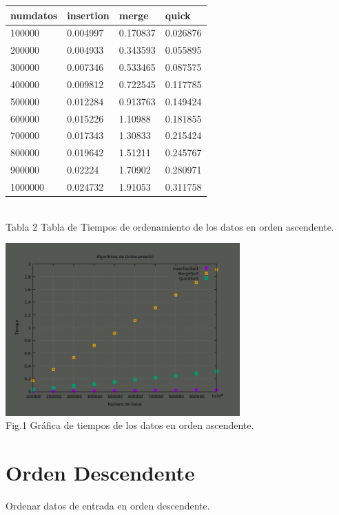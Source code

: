 \documentclass{article}
\begin{document}
\begin{center}
\begin{tabular}{|l|l|l|l|}
\hline
numdatos & insertion & merge & quick\\
\hline
100000 & 0.004997 & 0.170837 & 0.026876\\
200000 & 0.004933 & 0.343593 & 0.055895\\
300000 & 0.007346 & 0.533465 & 0.087575\\
400000 & 0.009812 & 0.722545 & 0.117785\\
500000 & 0.012284 & 0.913763 & 0.149424\\
600000 & 0.015226 & 1.10988 & 0.181855\\
700000 & 0.017343 & 1.30833 & 0.215424\\
800000 & 0.019642 & 1.51211 & 0.245767\\
900000 & 0.02224 & 1.70902 & 0.280971\\
1000000 & 0.024732 & 1.91053 & 0.311758\\
\hline
\end{tabular}\\

Tabla 2 Tabla de Tiempos de ordenamiento de los datos en orden ascendente.
\end{center}

\begin{center}
\includegraphics[width=9cm]{grafico_ascendente.png}\\

Fig.1 Gráfica de tiempos de los datos en orden ascendente.
\end{center}

\section{Orden Descendente}
Ordenar datos de entrada en orden descendente.
\end{document}
